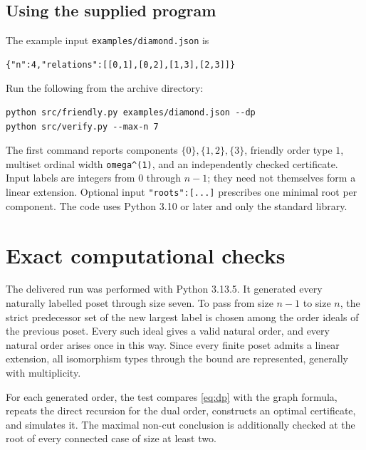 \documentclass[11pt,letterpaper]{article}
\theoremstyle{definition}
\theoremstyle{remark}
\begin{document}
\subsection{Using the supplied program}
The example input \texttt{examples/diamond.json} is
\begin{lstlisting}
{"n":4,"relations":[[0,1],[0,2],[1,3],[2,3]]}
\end{lstlisting}
Run the following from the archive directory:
\begin{lstlisting}
python src/friendly.py examples/diamond.json --dp
python src/verify.py --max-n 7
\end{lstlisting}
The first command reports components $\{0\},\{1,2\},\{3\}$, friendly order
type $1$, multiset ordinal width \texttt{omega\textasciicircum(1)}, and an independently
checked certificate. Input labels are integers from $0$ through $n-1$;
they need not themselves form a linear extension. Optional input
\texttt{"roots":[...]} prescribes one minimal root per component. The code
uses Python 3.10 or later and only the standard library.

\section{Exact computational checks}
\label{sec:verification}
The delivered run was performed with Python 3.13.5. It generated every
naturally labelled poset through size seven. To pass from size $n-1$ to
size $n$, the strict predecessor set of the new largest label is chosen
among the order ideals of the previous poset. Every such ideal gives a
valid natural order, and every natural order arises once in this way.
Since every finite poset admits a linear extension, all isomorphism types
through the bound are represented, generally with multiplicity.

For each generated order, the test compares \eqref{eq:dp} with the graph
formula, repeats the direct recursion for the dual order, constructs an
optimal certificate, and simulates it. The maximal non-cut conclusion is
additionally checked at the root of every connected case of size at least two.
\end{document}
